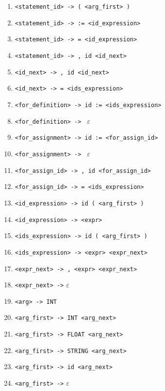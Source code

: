 \documentclass[a4paper, 12pt]{article}
\begin{document}
\begin{enumerate}[noitemsep]
            \item \verb|<statement_id> -> ( <arg_first> )|
            \item \verb|<statement_id> -> := <id_expression>|
            \item \verb|<statement_id> -> = <id_expression>|
            \item \verb|<statement_id> -> , id <id_next>|
            
            \item \verb|<id_next> -> , id <id_next>|
            \item \verb|<id_next> -> = <ids_expression>|
            
            \item \verb|<for_definition> -> id := <ids_expression>|
            \item \verb|<for_definition> -> | $\varepsilon$
            
            \item \verb|<for_assignment> -> id := <for_assign_id>|
            \item \verb|<for_assignment> -> | $\varepsilon$
            \item \verb|<for_assign_id> -> , id <for_assign_id>|
            \item \verb|<for_assign_id> -> = <ids_expression>|
            
            \item \verb|<id_expression> -> id ( <arg_first> )|
            \item \verb|<id_expression> -> <expr>|
            
            \item \verb|<ids_expression> -> id ( <arg_first> )|
            \item \verb|<ids_expression> -> <expr> <expr_next>|
            
            \item \verb|<expr_next> -> , <expr> <expr_next>|
            \item \verb|<expr_next> ->| $\varepsilon$
        
            \item \verb|<arg> -> INT|
            \item \verb|<arg_first> -> INT <arg_next>|
            \item \verb|<arg_first> -> FLOAT <arg_next>|
            \item \verb|<arg_first> -> STRING <arg_next>|
            \item \verb|<arg_first> -> id <arg_next>|
            \item \verb|<arg_first> ->| $\varepsilon$
           

\end{enumerate}
\end{document}
